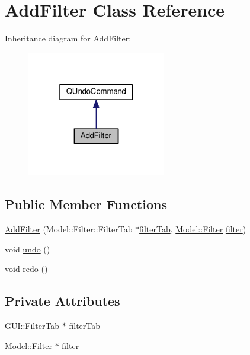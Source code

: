 \hypertarget{classUndoRedo_1_1AddFilter}{}\section{Add\+Filter Class Reference}
\label{classUndoRedo_1_1AddFilter}


Inheritance diagram for Add\+Filter\+:
\nopagebreak
\begin{figure}[H]
\begin{center}
\leavevmode
\includegraphics[width=172pt]{classUndoRedo_1_1AddFilter__inherit__graph}
\end{center}
\end{figure}
\subsection*{Public Member Functions}
\begin{DoxyCompactItemize}
\item 
\hyperlink{classUndoRedo_1_1AddFilter_a5a59ac8760928a47325c5d9722ca88cd}{Add\+Filter} (Model\+::\+Filter\+::\+Filter\+Tab $\ast$\hyperlink{classUndoRedo_1_1AddFilter_a47ca82534a740774d79998759818d9f4}{filter\+Tab}, \hyperlink{classModel_1_1Filter}{Model\+::\+Filter} \hyperlink{classUndoRedo_1_1AddFilter_a573678d67a3af0d81b06a4bb3a88957e}{filter})
\item 
void \hyperlink{classUndoRedo_1_1AddFilter_a0e1e7804a53f6d62efc72c9bdbec8571}{undo} ()
\item 
void \hyperlink{classUndoRedo_1_1AddFilter_a93c48d6ed036e1a381be53ac67643284}{redo} ()
\end{DoxyCompactItemize}
\subsection*{Private Attributes}
\begin{DoxyCompactItemize}
\item 
\hyperlink{classGUI_1_1FilterTab}{G\+U\+I\+::\+Filter\+Tab} $\ast$ \hyperlink{classUndoRedo_1_1AddFilter_a47ca82534a740774d79998759818d9f4}{filter\+Tab}
\item 
\hyperlink{classModel_1_1Filter}{Model\+::\+Filter} $\ast$ \hyperlink{classUndoRedo_1_1AddFilter_a573678d67a3af0d81b06a4bb3a88957e}{filter}
\end{DoxyCompactItemize}


